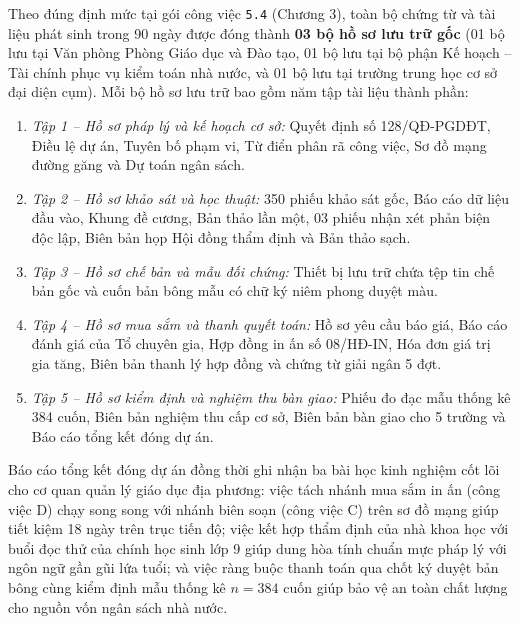 Theo đúng định mức tại gói công việc \texttt{5.4} (Chương 3), toàn bộ chứng từ và tài liệu phát sinh trong 90 ngày được đóng thành \textbf{03 bộ hồ sơ lưu trữ gốc} (01 bộ lưu tại Văn phòng Phòng Giáo dục và Đào tạo, 01 bộ lưu tại bộ phận Kế hoạch -- Tài chính phục vụ kiểm toán nhà nước, và 01 bộ lưu tại trường trung học cơ sở đại diện cụm). Mỗi bộ hồ sơ lưu trữ bao gồm năm tập tài liệu thành phần:
\begin{enumerate}
    \item \textit{Tập 1 -- Hồ sơ pháp lý và kế hoạch cơ sở:} Quyết định số 128/QĐ-PGDĐT, Điều lệ dự án, Tuyên bố phạm vi, Từ điển phân rã công việc, Sơ đồ mạng đường găng và Dự toán ngân sách.
    \item \textit{Tập 2 -- Hồ sơ khảo sát và học thuật:} 350 phiếu khảo sát gốc, Báo cáo dữ liệu đầu vào, Khung đề cương, Bản thảo lần một, 03 phiếu nhận xét phản biện độc lập, Biên bản họp Hội đồng thẩm định và Bản thảo sạch.
    \item \textit{Tập 3 -- Hồ sơ chế bản và mẫu đối chứng:} Thiết bị lưu trữ chứa tệp tin chế bản gốc và cuốn bản bông mẫu có chữ ký niêm phong duyệt màu.
    \item \textit{Tập 4 -- Hồ sơ mua sắm và thanh quyết toán:} Hồ sơ yêu cầu báo giá, Báo cáo đánh giá của Tổ chuyên gia, Hợp đồng in ấn số 08/HĐ-IN, Hóa đơn giá trị gia tăng, Biên bản thanh lý hợp đồng và chứng từ giải ngân 5 đợt.
    \item \textit{Tập 5 -- Hồ sơ kiểm định và nghiệm thu bàn giao:} Phiếu đo đạc mẫu thống kê 384 cuốn, Biên bản nghiệm thu cấp cơ sở, Biên bản bàn giao cho 5 trường và Báo cáo tổng kết đóng dự án.
\end{enumerate}

Báo cáo tổng kết đóng dự án đồng thời ghi nhận ba bài học kinh nghiệm cốt lõi cho cơ quan quản lý giáo dục địa phương: việc tách nhánh mua sắm in ấn (công việc D) chạy song song với nhánh biên soạn (công việc C) trên sơ đồ mạng giúp tiết kiệm 18 ngày trên trục tiến độ; việc kết hợp thẩm định của nhà khoa học với buổi đọc thử của chính học sinh lớp 9 giúp dung hòa tính chuẩn mực pháp lý với ngôn ngữ gần gũi lứa tuổi; và việc ràng buộc thanh toán qua chốt ký duyệt bản bông cùng kiểm định mẫu thống kê $n = 384$ cuốn giúp bảo vệ an toàn chất lượng cho nguồn vốn ngân sách nhà nước.

